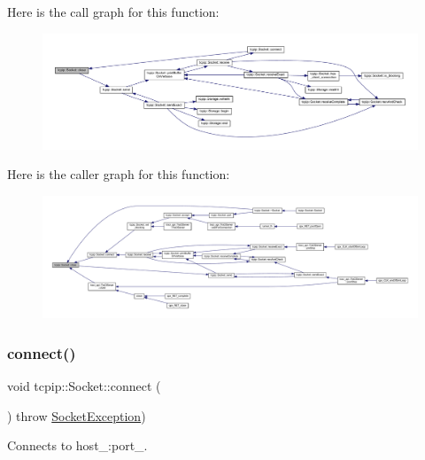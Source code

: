 Here is the call graph for this function\+:
\nopagebreak
\begin{figure}[H]
\begin{center}
\leavevmode
\includegraphics[width=350pt]{classtcpip_1_1_socket_adda6f45e2b5fabc7f539f4ddcbe4b144_cgraph}
\end{center}
\end{figure}
Here is the caller graph for this function\+:
\nopagebreak
\begin{figure}[H]
\begin{center}
\leavevmode
\includegraphics[width=350pt]{classtcpip_1_1_socket_adda6f45e2b5fabc7f539f4ddcbe4b144_icgraph}
\end{center}
\end{figure}
\mbox{\label{classtcpip_1_1_socket_a8f89d187776729d15db3ba5c99c36acd}} 
\subsubsection{\texorpdfstring{connect()}{connect()}}
{\footnotesize\ttfamily void tcpip\+::\+Socket\+::connect (\begin{DoxyParamCaption}{ }\end{DoxyParamCaption}) throw  \hyperlink{classtcpip_1_1_socket_exception}{Socket\+Exception}) }



Connects to host\+\_\+\+:port\+\_\+. 


